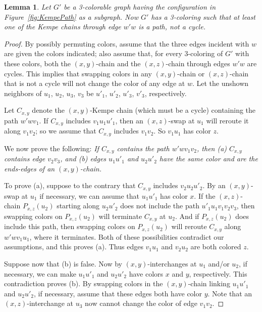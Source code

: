 \documentclass[12pt]{article}
\theoremstyle{plain}
\newtheorem{lem}[prop]{Lemma}
\theoremstyle{definition}
\theoremstyle{remark}
\begin{document}
\begin{lem}
Let $G'$ be a 3-colorable graph having the configuration in
Figure~\ref{fig:KempePath} as a subgraph.  Now $G'$ has a 3-coloring such that
at least one of the Kempe chains through edge $w'w$ is a path, not a cycle.
\label{lem:new1}
\end{lem}
\begin{proof}
By possibly permuting colors, assume that the three edges incident with $w$ are
given the colors indicated; also assume that, for every 3-coloring of $G'$ with
these colors, both the $(x,y)$-chain and the $(x,z)$-chain through edges $w'w$
are cycles.  This implies that swapping colors in any $(x,y)$-chain or
$(x,z)$-chain that is not a cycle will not change the color of any edge at $w$.
Let the unshown neighbors of $u_1$, $u_2$, $u_3$, $v_3$ be $u'_1$, $u'_2$,
$u'_3$, $v'_3$, respectively.

Let $C_{x,y}$ denote the $(x,y)$-Kempe chain (which must be a cycle) containing
the path $w'wv_1$.  If $C_{x,y}$ includes $v_1u_1u'_1$, then an $(x,z)$-swap at
$u_1$ will reroute it along $v_1v_2$; so we assume that $C_{x,y}$ includes
$v_1v_2$.  So $v_1u_1$ has color $z$.

We now prove the following: \textit{If $C_{x,y}$ contains the path
$w'wv_1v_2$, then (a) $C_{x,y}$ contains edge $v_2v_3$, and (b) edges $u_1u'_1$
and $u_2u'_2$ have the same color and are the ends-edges of an $(x,y)$-chain.}

To prove (a), suppose to the contrary that $C_{x,y}$ includes $v_2u_2u'_2$.  By
an $(x,y)$-swap at $u_1$ if necessary, we can assume that $u_1u'_1$ has color
$x$.  If the $(x,z)$-chain $P_{x,z}(u_2)$ starting along $u_2u'_2$ does not
include the path $u'_1u_1v_1v_2v_3$, then swapping colors on $P_{x,z}(u_2)$ will
terminate $C_{x,y}$ at $u_2$.  And if $P_{x,z}(u_2)$ does include this path,
then swapping colors on $P_{x,z}(u_2)$ will reroute $C_{x,y}$ along $w'wv_1u_1$,
where it terminates.  Both of these possibilities contradict our assumptions,
and this proves (a).  Thus edges $v_1u_1$ and $v_2u_2$ are both colored $z$.

Suppose now that (b) is false.  Now by $(x,y)$-interchanges at $u_1$ and/or
$u_2$, if necessary, we can make $u_1u'_1$ and $u_2u'_2$ have colors $x$ and
$y$, respectively.  This contradiction proves (b).  By swapping colors in the
$(x,y)$-chain linking $u_1u'_1$ and $u_2u'_2$, if necessary, assume that these
edges both have color $y$.  Note that an $(x,z)$-interchange at $u_3$ now cannot
change the color of edge $v_1v_2$.


\end{proof}
\end{document}
